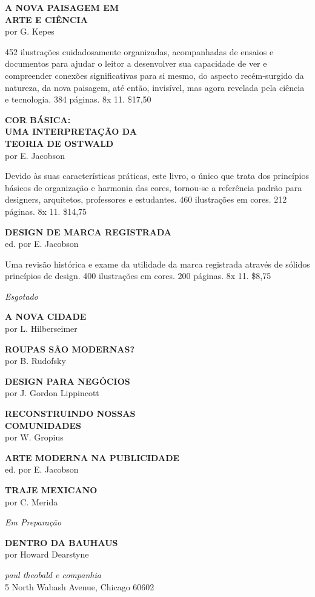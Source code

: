 \documentclass[a4paper]{article}
\begin{document}
\bigskip

\textbf{A NOVA PAISAGEM EM} \\
\textbf{ARTE E CIÊNCIA} \\
por G. Kepes

452 ilustrações cuidadosamente organizadas, acompanhadas de ensaios e documentos para ajudar o leitor a desenvolver sua capacidade de ver e compreender conexões significativas para si mesmo, do aspecto recém-surgido da natureza, da nova paisagem, até então, invisível, mas agora revelada pela ciência e tecnologia. 384 páginas. 8\textonehalf x 11.
\hfill \$17,50

\bigskip

\textbf{COR BÁSICA:} \\
\textbf{UMA INTERPRETAÇÃO DA} \\
\textbf{TEORIA DE OSTWALD} \\
por E. Jacobson

Devido às suas características práticas, este livro, o único que trata dos princípios básicos de organização e harmonia das cores, tornou-se a referência padrão para designers, arquitetos, professores e estudantes. 460 ilustrações em cores. 212 páginas. 8\textonehalf x 11.
\hfill \$14,75

\bigskip

\textbf{DESIGN DE MARCA REGISTRADA} \\
ed. por E. Jacobson

Uma revisão histórica e exame da utilidade da marca registrada através de sólidos princípios de design. 400 ilustrações em cores. 200 páginas. 8\textonehalf x 11.
\hfill \$8,75

\bigskip\bigskip\bigskip

\emph{Esgotado}

\textbf{A NOVA CIDADE} \\
por L. Hilberseimer

\textbf{ROUPAS SÃO MODERNAS?} \\
por B. Rudofsky

\textbf{DESIGN PARA NEGÓCIOS} \\
por J. Gordon Lippincott

\textbf{RECONSTRUINDO NOSSAS} \\
\textbf{COMUNIDADES} \\
por W. Gropius

\textbf{ARTE MODERNA NA PUBLICIDADE} \\
ed. por E. Jacobson

\textbf{TRAJE MEXICANO} \\
por C. Merida

\bigskip

\emph{Em Preparação}

\textbf{DENTRO DA BAUHAUS} \\
por Howard Dearstyne

\vspace{2cm}

\raggedright
\emph{paul theobald e companhia} \\
5 North Wabash Avenue, Chicago 60602
\end{document}
